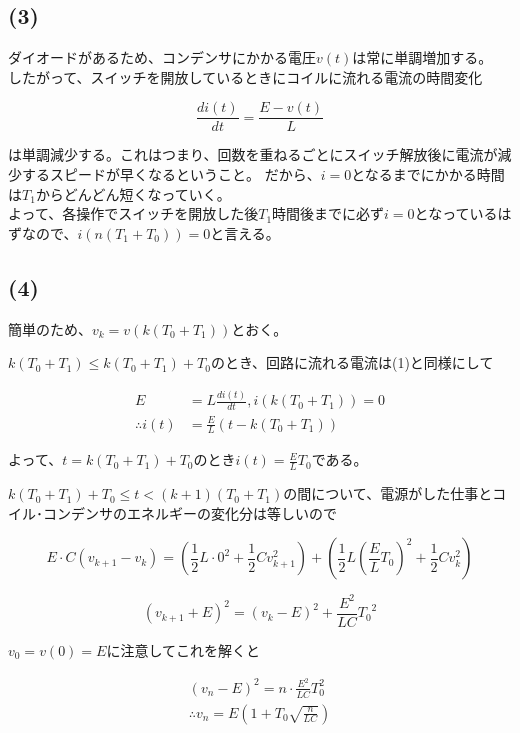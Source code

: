 \documentclass[a4paper,12pt,xelatex,ja=standard]{bxjsarticle}
\begin{document}
\subsection*{(3)}

ダイオードがあるため、コンデンサにかかる電圧\(v(t)\)は常に単調増加する。\\
したがって、スイッチを開放しているときにコイルに流れる電流の時間変化

\[
  \frac{di(t)}{dt} = \frac{E - v(t)}{L}
\]

\noindent
は単調減少する。これはつまり、回数を重ねるごとにスイッチ解放後に電流が減少するスピードが早くなるということ。
だから、\(i=0\)となるまでにかかる時間は\(T_1\)からどんどん短くなっていく。\\
よって、各操作でスイッチを開放した後\(T_1\)時間後までに必ず\(i=0\)となっているはずなので、\(i(n(T_1 + T_0)) = 0\)と言える。

\subsection*{(4)}

簡単のため、\(v_k = v(k(T_0 + T_1))\)とおく。

\(k(T_0 + T_1) \leq k (T_0 + T_1) + T_0\)のとき、回路に流れる電流は(1)と同様にして

\begin{equation}
  \begin{split}
    E &= L \frac{d i(t)}{dt}, i(k(T_0 + T_1)) = 0 \\
    \therefore i(t) &= \frac{E}{L}(t - k(T_0 + T_1))
  \end{split}
\end{equation}

よって、\(t = k(T_0 + T_1) + T_0\)のとき\(i(t) = \frac{E}{L}T_0\)である。

\(k(T_0 + T_1) + T_0 \leq t < (k+1) (T_0 + T_1)\)の間について、電源がした仕事とコイル･コンデンサのエネルギーの変化分は等しいので

\[
  E \cdot C(v_{k+1} - v_k) = \left(\frac{1}{2} L \cdot 0^2 + \frac{1}{2}C v_{k+1}^2\right) +
    \left(\frac{1}{2} L (\frac{E}{L}T_0)^2 + \frac{1}{2}C v_{k}^2\right)
\]

\[
  (v_{k+1} + E)^2 = (v_k - E)^2 + \frac{E^2}{LC} {T_0}^2
\]

\(v_0 = v(0) = E\)に注意してこれを解くと

\begin{equation*}
  \begin{split}
    (v_n - E)^2 = n \cdot \frac{E^{2}}{LC}T_0^{2} \\
    \therefore v_n = E \left(1 + T_0 \sqrt{\frac{n}{LC}} \right)
  \end{split}
\end{equation*}
\end{document}
